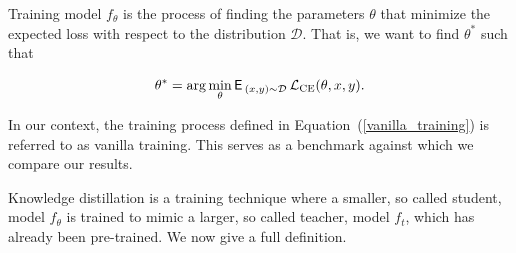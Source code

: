 Training model $f_\theta$ is the process of finding the parameters $\theta$ that minimize the expected loss with respect to the distribution $\mathcal{D}$. That is, we want to find $\theta^*$ such that

\begin{equation}
	\theta^* = \arg \min_\theta \operatorname{\textsf{E}\,}_{(x,y) \sim \mathcal{D}} \mathcal{L_{\text{CE}}}(\theta,x,y).
	\label{vanilla_training}
\end{equation}

\begin{rem}
	In our context, the training process defined in Equation~(\ref{vanilla_training}) is referred to as vanilla training. This serves as a benchmark against which we compare our results.
\end{rem}

Knowledge distillation is a training technique where a smaller, so called student, model $f_\theta$ is trained to mimic a larger, so called teacher, model $f_t$, which has already been pre-trained. We now give a full definition.


